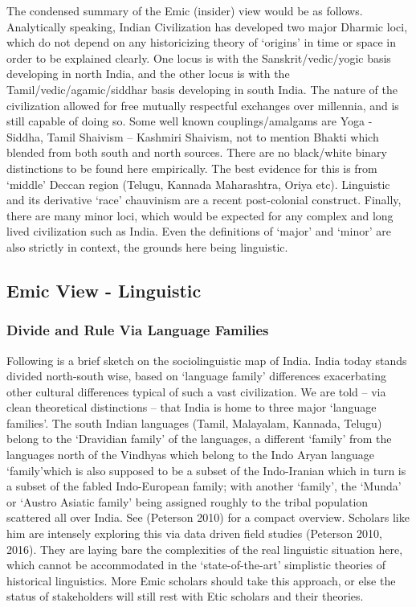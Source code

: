 The condensed summary of the Emic (insider) view would be as follows. Analytically speaking, Indian Civilization has developed two major Dharmic loci, which do not depend on any historicizing theory of ‘origins’ in time or space in order to be explained clearly. One locus is with the Sanskrit/vedic/yogic basis developing in north India, and the other locus is with the Tamil/vedic/agamic/siddhar basis developing in south India. The nature of the civilization allowed for free mutually respectful exchanges over millennia, and is still capable of doing so. Some well known couplings/amalgams are Yoga - Siddha, Tamil Shaivism – Kashmiri Shaivism, not to mention Bhakti which blended from both south and north sources. There are no black/white binary distinctions to be found here empirically. The best evidence for this is from ‘middle’ Deccan region (Telugu, Kannada Maharashtra, Oriya etc). Linguistic and its derivative ‘race’ chauvinism are a recent post-colonial construct. Finally, there are many minor loci, which would be expected for any complex and long lived civilization such as India. Even the definitions of ‘major’ and ‘minor’ are also strictly in context, the grounds here being linguistic.

\subsection*{Emic View - Linguistic}

\vskip -8pt

\subsubsection*{Divide and Rule Via Language Families}

\vskip -8pt

Following is a brief sketch on the sociolinguistic map of India. India today stands divided north-south wise, based on ‘language family’ differences exacerbating other cultural differences typical of such a vast civilization. We are told – via clean theoretical distinctions – that India is home to three major ‘language families’. The south Indian languages (Tamil, Malayalam, Kannada, Telugu) belong to the ‘Dravidian family’ of the languages, a different ‘family’ from the languages north of the Vindhyas which belong to the Indo Aryan language ‘family’which is also supposed to be a subset of the Indo-Iranian which in turn is a subset of the fabled Indo-European family; with another ‘family’, the ‘Munda’ or ‘Austro Asiatic family’ being assigned roughly to the tribal population scattered all over India. See (Peterson 2010) for a compact overview. Scholars like him are intensely exploring this via data driven field studies (Peterson 2010, 2016). They are laying bare the complexities of the real linguistic situation here, which cannot be accommodated in the ‘state-of-the-art’ simplistic theories of historical linguistics. More Emic scholars should take this approach, or else the status of stakeholders will still rest with Etic scholars and their theories.

